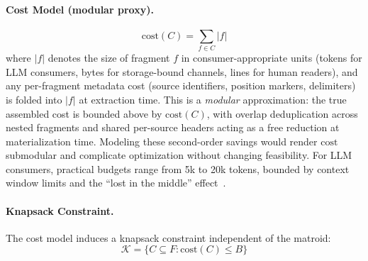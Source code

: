 \documentclass[11pt, a4paper]{article}
\begin{document}
\paragraph{Cost Model (modular proxy).}
\begin{equation}
\mathrm{cost}(C) = \sum_{f \in C} |f|
\end{equation}
where $|f|$ denotes the size of fragment $f$ in consumer-appropriate units (tokens for LLM consumers, bytes for storage-bound channels, lines for human readers), and any per-fragment metadata cost (source identifiers, position markers, delimiters) is folded into $|f|$ at extraction time. This is a \emph{modular} approximation: the true assembled cost is bounded above by $\mathrm{cost}(C)$, with overlap deduplication across nested fragments and shared per-source headers acting as a free reduction at materialization time. Modeling these second-order savings would render $\mathrm{cost}$ submodular and complicate optimization without changing feasibility. For LLM consumers, practical budgets range from 5k to 20k tokens, bounded by context window limits and the ``lost in the middle'' effect~\cite{liu2023lost}.

\paragraph{Knapsack Constraint.} The cost model induces a knapsack constraint independent of the matroid:
\begin{equation}
\mathcal{K} = \{C \subseteq F : \mathrm{cost}(C) \leq B\}
\end{equation}
\end{document}
